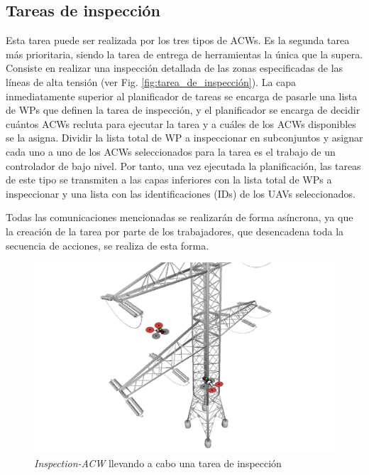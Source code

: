 \documentclass[fontsize=11pt, English=false, Español=true, Myfinal=true, twoside, numbers=noenddot]{scrbook}
\begin{document}
{\subsection{Tareas de inspección}
\label{subsec:InspectionTasks}
Esta tarea puede ser realizada por los tres tipos de \glspl{ACW}. Es la segunda tarea más prioritaria, siendo la tarea de entrega de herramientas la única que la supera. Consiste en realizar una inspección detallada de las zonas especificadas de las líneas de alta tensión (ver Fig. \ref{fig:tarea_de_inspección}). La capa inmediatamente superior al planificador de tareas se encarga de pasarle una lista de \glspl{WP} que definen la tarea de inspección, y el planificador se encarga de decidir cuántos \glspl{ACW} recluta para ejecutar la tarea y a cuáles de los \glspl{ACW} disponibles se la asigna. Dividir la lista total de \gls{WP} a inspeccionar en subconjuntos y asignar cada uno a uno de los \glspl{ACW} seleccionados para la tarea es el trabajo de un controlador de bajo nivel. Por tanto, una vez ejecutada la planificación, las tareas de este tipo se transmiten a las capas inferiores con la lista total de \glspl{WP} a inspeccionar y una lista con las identificaciones (\glspl{ID}) de los \glspl{UAV} seleccionados.

Todas las comunicaciones mencionadas se realizarán de forma asíncrona, ya que la creación de la tarea por parte de los trabajadores, que desencadena toda la secuencia de acciones, se realiza de esta forma.

\begin{figure}[htbp]
    \centering
    \includegraphics[width=.75\linewidth]
    {ProblemFormulation/figures/inspection_task.pdf}
    \caption{\textit{Inspection-ACW} llevando a cabo una tarea de inspección}
    \label{fig:inspection_task}
\end{figure}

}
\end{document}
